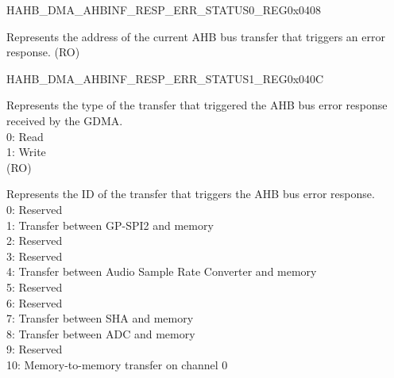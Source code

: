 \begin{register}{H}{AHB\_DMA\_AHBINF\_RESP\_ERR\_STATUS0\_REG}{0x0408}\label{regdesc:AHBDMAAHBINFRESPERRSTATUS0REG}
%
\regnewline%
\begin{regdesc}\begin{reglist}
\label{fielddesc:AHBDMAAHBINFRESPERRADDR}\item [AHB\_DMA\_AHBINF\_RESP\_ERR\_ADDR] Represents the address of the current AHB bus transfer that triggers an error response. (RO)
\end{reglist}\end{regdesc}
\end{register}


\begin{register}{H}{AHB\_DMA\_AHBINF\_RESP\_ERR\_STATUS1\_REG}{0x040C}\label{regdesc:AHBDMAAHBINFRESPERRSTATUS1REG}
%
%
%
%
\regnewline%
\begin{regdesc}\begin{reglist}
\label{fielddesc:AHBDMAAHBINFRESPERRWR}\item [AHB\_DMA\_AHBINF\_RESP\_ERR\_WR] Represents the type of the transfer that triggered the AHB bus error response received by the GDMA.\\
0: Read\\
1: Write\\ (RO)
\label{fielddesc:AHBDMAAHBINFRESPERRID}\item [AHB\_DMA\_AHBINF\_RESP\_ERR\_ID] Represents the ID of the transfer that triggers the AHB bus error response.\\
0: Reserved\\
1: Transfer between GP-SPI2 and memory\\
2: Reserved\\
3: Reserved\\
4: Transfer between Audio Sample Rate Converter and memory\\
5: Reserved\\
6: Reserved\\
7: Transfer between SHA and memory\\
8: Transfer between ADC and memory\\
9: Reserved\\
10: Memory-to-memory transfer on channel 0\\

\end{reglist}
\end{regdesc}
\end{register}

